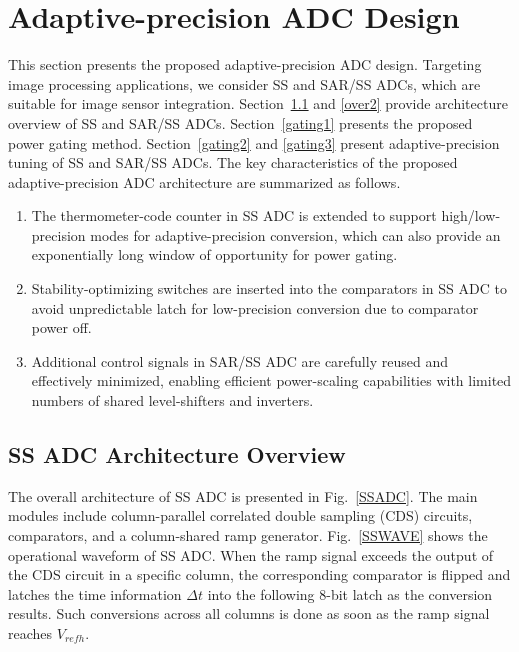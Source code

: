 \section{Adaptive-precision ADC Design}\label{architecture}

This section presents the proposed adaptive-precision ADC design. Targeting image processing applications, we consider SS and SAR/SS ADCs, which are suitable for image sensor integration. 
Section~\ref{over1} and \ref{over2} provide architecture overview of SS and SAR/SS ADCs. 
Section~\ref{gating1} presents the proposed power gating method. 
Section~\ref{gating2} and \ref{gating3} present adaptive-precision tuning of SS and SAR/SS ADCs. The key characteristics of the proposed adaptive-precision ADC architecture are summarized 
as follows. 


\begin{enumerate}[\IEEEsetlabelwidth{3)}]
	\item 
	The thermometer-code counter in SS ADC is extended to support high/low-precision modes for adaptive-precision conversion, which can also provide an exponentially long window of opportunity for power gating.
	\item
    Stability-optimizing switches are inserted into the comparators in SS ADC to avoid unpredictable latch for low-precision conversion due to comparator power off. 
    \item
    Additional control signals in SAR/SS ADC are carefully reused and effectively minimized, enabling efficient power-scaling capabilities with limited numbers of shared level-shifters and inverters.      
\end{enumerate} 



\subsection{SS ADC Architecture Overview}\label{over1}

The overall architecture of SS ADC is presented in Fig.~\ref{SSADC}. The main modules include column-parallel correlated double sampling (CDS) circuits, comparators, 
and a column-shared ramp generator. Fig.~\ref{SSWAVE} shows the operational waveform of SS ADC. When the ramp signal exceeds the output of the CDS circuit in a specific column, 
the corresponding comparator is flipped and latches the time information $\Delta t$ into the following 8-bit latch as the conversion results. 
Such conversions across all columns is done as soon as the ramp signal reaches $V_{refh}$.

